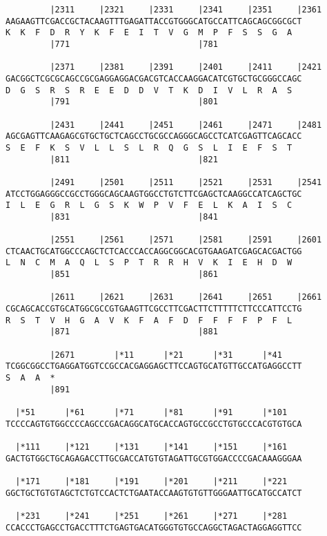 \documentclass{article}
\begin{document}
\begin{Verbatim}
         |2311     |2321     |2331     |2341     |2351     |2361
AAGAAGTTCGACCGCTACAAGTTTGAGATTACCGTGGGCATGCCATTCAGCAGCGGCGCT
K  K  F  D  R  Y  K  F  E  I  T  V  G  M  P  F  S  S  G  A  
         |771                          |781                 
  
         |2371     |2381     |2391     |2401     |2411     |2421
GACGGCTCGCGCAGCCGCGAGGAGGACGACGTCACCAAGGACATCGTGCTGCGGGCCAGC
D  G  S  R  S  R  E  E  D  D  V  T  K  D  I  V  L  R  A  S  
         |791                          |801                 
  
         |2431     |2441     |2451     |2461     |2471     |2481
AGCGAGTTCAAGAGCGTGCTGCTCAGCCTGCGCCAGGGCAGCCTCATCGAGTTCAGCACC
S  E  F  K  S  V  L  L  S  L  R  Q  G  S  L  I  E  F  S  T  
         |811                          |821                 
  
         |2491     |2501     |2511     |2521     |2531     |2541
ATCCTGGAGGGCCGCCTGGGCAGCAAGTGGCCTGTCTTCGAGCTCAAGGCCATCAGCTGC
I  L  E  G  R  L  G  S  K  W  P  V  F  E  L  K  A  I  S  C  
         |831                          |841                 
  
         |2551     |2561     |2571     |2581     |2591     |2601
CTCAACTGCATGGCCCAGCTCTCACCCACCAGGCGGCACGTGAAGATCGAGCACGACTGG
L  N  C  M  A  Q  L  S  P  T  R  R  H  V  K  I  E  H  D  W  
         |851                          |861                 
  
         |2611     |2621     |2631     |2641     |2651     |2661
CGCAGCACCGTGCATGGCGCCGTGAAGTTCGCCTTCGACTTCTTTTTCTTCCCATTCCTG
R  S  T  V  H  G  A  V  K  F  A  F  D  F  F  F  F  P  F  L  
         |871                          |881                 
  
         |2671        |*11      |*21      |*31      |*41    
TCGGCGGCCTGAGGATGGTCCGCCACGAGGAGCTTCCAGTGCATGTTGCCATGAGGCCTT
S  A  A  *   
         |891                                               
  
  |*51      |*61      |*71      |*81      |*91      |*101   
TCCCCAGTGTGGCCCCAGCCCGACAGGCATGCACCAGTGCCGCCTGTGCCCACGTGTGCA
  
  |*111     |*121     |*131     |*141     |*151     |*161   
GACTGTGGCTGCAGAGACCTTGCGACCATGTGTAGATTGCGTGGACCCCGACAAAGGGAA
  
  |*171     |*181     |*191     |*201     |*211     |*221   
GGCTGCTGTGTAGCTCTGTCCACTCTGAATACCAAGTGTGTTGGGAATTGCATGCCATCT
  
  |*231     |*241     |*251     |*261     |*271     |*281   
CCACCCTGAGCCTGACCTTTCTGAGTGACATGGGTGTGCCAGGCTAGACTAGGAGGTTCC
  

\end{Verbatim}
\end{document}
